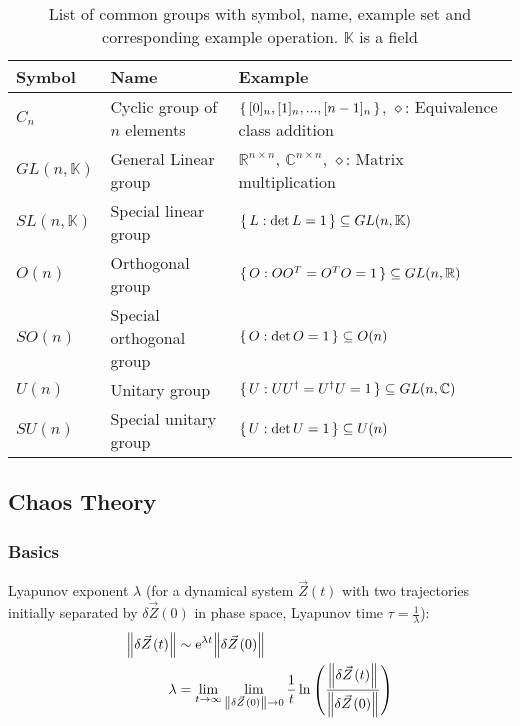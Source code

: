 			\begin{table}[ht]
				\begin{center}
				\begin{tabular}{ l | l | l }
					Symbol & Name & Example \\ \hline
					$C_n$ & Cyclic group of $n$ elements & $\set{[0]_n, [1]_n, ..., [n-1]_n}$, $\diamond$: Equivalence class addition \\
					$GL(n, \mathbb{K})$ & General Linear group & $\mathbb{R}^{n\times n}$, $\mathbb{C}^{n\times n}$, $\diamond$: Matrix multiplication \\
					$SL(n, \mathbb{K})$ & Special linear group & $\set{L: \det L = 1} \subseteq GL(n, \mathbb{K})$ \\
					$O(n)$ & Orthogonal group & $\set{O: OO^{T}=O^{T}O=1}\subseteq GL(n, \mathbb{R})$ \\
					$SO(n)$ & Special orthogonal group& $\set{O: \det O = 1}\subseteq O(n)$\\
					$U(n)$ & Unitary group & $\set{U: UU^{\dagger}=U^{\dagger}U=1}\subseteq GL(n, \mathbb{C})$ \\
					$SU(n)$ & Special unitary group & $\set{U: \det U = 1}\subseteq U(n)$ \\
					\end{tabular}
					\caption{List of common groups with symbol, name, example set and corresponding example operation. $\mathbb{K}$ is a field}
				\end{center}
			\end{table} \vsp


		

	\subsection{Chaos Theory}
		\subsubsection{Basics}
			Lyapunov exponent $\lambda$ (for a dynamical system $\vec{Z}(t)$ with two trajectories initially separated by $\delta\vec{Z}(0)$ in phase space, Lyapunov time $\tau=\frac{1}{\lambda}$):
			\begin{equation}
				\begin{aligned}
					\norm{\delta\vec{Z}(t)} &\sim \ex^{\lambda t} \norm{\delta\vec{Z}(0)}\\
					\lambda &= \lim_{t\rightarrow\infty} \lim_{\norm{\delta\vec{Z}(0)}\rightarrow 0} \frac{1}{t} \ln\qty(\frac{\norm{\delta \vec{Z}(t)}}{\norm{\delta\vec{Z}(0)}}) \\
				\end{aligned}
			\end{equation}